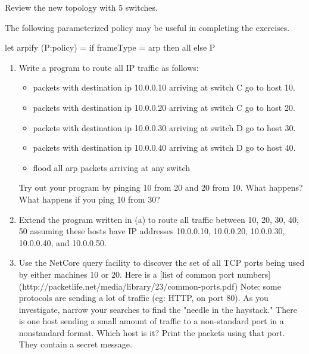 \documentclass{article}
\begin{document}
Review the new topology with 5 switches.  

The following parameterized policy may be useful in completing the
exercises.

\begin{progeg}
let arpify (P:policy) =
  if frameType = arp then all
  else P
\end{progeg}

\noindent
\begin{enumerate}
\item Write a program to route all IP traffic as follows: 
\begin{itemize}
  \item packets with destination ip 10.0.0.10 arriving at switch C go to host 10.  
  \item packets with destination ip 10.0.0.20 arriving at switch C go to host 20.  
  \item packets with destination ip 10.0.0.30 arriving at switch D go to host 30.  
  \item packets with destination ip 10.0.0.40 arriving at switch D go to host 40.  
  \item flood all arp packets arriving at any switch
\end{itemize}
Try out your program by pinging 10 from 20 and 20 from 10.  What happens?
What happens if you ping 10 from 30?

\item
Extend the program written in (a) to route all traffic between
10, 20, 30, 40, 50 assuming these hosts have IP addresses 
10.0.0.10, 10.0.0.20, 10.0.0.30, 10.0.0.40, and 10.0.0.50.

\item Use the NetCore query facility to discover the set of all TCP ports 
being used by either machines 10 or 20.  Here is a [list of common port
numbers](http://packetlife.net/media/library/23/common-ports.pdf)
Note: some protocols are sending a lot of traffic (eg: HTTP, on port
80).  As you investigate, narrow your searches to find the "needle in
the haystack."  There is one host sending a small amount of traffic to
a non-standard port in a nonstandard format.  Which host is it?  Print
the packets using that port.  They contain a secret message.


\end{enumerate}
\end{document}

